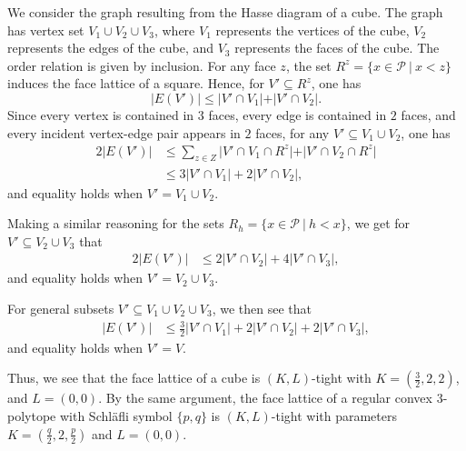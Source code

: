 \documentclass{article}
\begin{document}
\begin{example}
We consider the graph resulting from the Hasse diagram of a cube. The graph has vertex set $V_1 \cup V_2 \cup V_3$, where $V_1$ represents the vertices of the cube, $V_2$ represents the edges of the cube, and $V_3$ represents the faces of the cube. The order relation is given by inclusion. For any face $z$, the set $R^z= \{x\in \mathcal{P}~\vert~ x < z\}$ induces the face lattice of a square. Hence, for $V'\subseteq R^z$, one has
\begin{equation*}
    \vert E(V')\vert \leq \vert V'\cap V_1 \vert   + \vert V'\cap V_2\vert .
\end{equation*}
Since every vertex is contained in $3$ faces, every edge is contained in $2$ faces, and every incident vertex-edge pair appears in $2$ faces, for any $V'\subseteq V_1\cup V_2$, one has
\begin{align*}
    2 \vert E(V')\vert &\leq \sum_{z\in Z} \vert V'\cap V_1\cap R^z \vert   + \vert V'\cap V_2 \cap R^z\vert\\
    &\leq 3 \vert V'\cap V_1 \vert  + 2 \vert V'\cap V_2 \vert,
\end{align*}
and equality holds when $V'=V_1\cup V_2.$

Making a similar reasoning for the sets $R_{h}=\{x\in \mathcal{P}~\vert ~h < x\}$, we get for $V'\subseteq V_2 \cup V_3$ that
\begin{align*}
    2 \vert E(V')\vert &\leq 2 \vert V'\cap V_2 \vert   + 4 \vert V'\cap V_3\vert,
\end{align*}
and equality holds when $V'=V_2\cup V_3.$

For general subsets $V'\subseteq V_1\cup V_2 \cup V_3$, we then see that
\begin{align*}
    \vert E(V')\vert &\leq \frac{3}{2}\vert V'\cap V_1 \vert + 2 \vert V'\cap V_2 \vert   + 2 \vert V'\cap V_3\vert,
\end{align*}
and equality holds when $V'=V.$

Thus, we see that the face lattice of a cube is $(K,L)$-tight with $K=(\frac{3}{2}, 2, 2)$, and $L=(0,0)$. 
By the same argument, the face lattice of a regular convex $3$-polytope with Schläfli symbol $\{p,q\}$ is $(K, L)$-tight with parameters $K=(\frac{q}{2}, 2,\frac{p}{2})$ and $L=(0,0)$.
\end{example}
\end{document}
